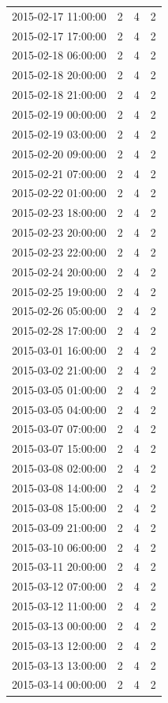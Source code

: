 \begin{tabular}{lrrr}
2015-02-17 11:00:00 & 2 & 4 & 2 \\
2015-02-17 17:00:00 & 2 & 4 & 2 \\
2015-02-18 06:00:00 & 2 & 4 & 2 \\
2015-02-18 20:00:00 & 2 & 4 & 2 \\
2015-02-18 21:00:00 & 2 & 4 & 2 \\
2015-02-19 00:00:00 & 2 & 4 & 2 \\
2015-02-19 03:00:00 & 2 & 4 & 2 \\
2015-02-20 09:00:00 & 2 & 4 & 2 \\
2015-02-21 07:00:00 & 2 & 4 & 2 \\
2015-02-22 01:00:00 & 2 & 4 & 2 \\
2015-02-23 18:00:00 & 2 & 4 & 2 \\
2015-02-23 20:00:00 & 2 & 4 & 2 \\
2015-02-23 22:00:00 & 2 & 4 & 2 \\
2015-02-24 20:00:00 & 2 & 4 & 2 \\
2015-02-25 19:00:00 & 2 & 4 & 2 \\
2015-02-26 05:00:00 & 2 & 4 & 2 \\
2015-02-28 17:00:00 & 2 & 4 & 2 \\
2015-03-01 16:00:00 & 2 & 4 & 2 \\
2015-03-02 21:00:00 & 2 & 4 & 2 \\
2015-03-05 01:00:00 & 2 & 4 & 2 \\
2015-03-05 04:00:00 & 2 & 4 & 2 \\
2015-03-07 07:00:00 & 2 & 4 & 2 \\
2015-03-07 15:00:00 & 2 & 4 & 2 \\
2015-03-08 02:00:00 & 2 & 4 & 2 \\
2015-03-08 14:00:00 & 2 & 4 & 2 \\
2015-03-08 15:00:00 & 2 & 4 & 2 \\
2015-03-09 21:00:00 & 2 & 4 & 2 \\
2015-03-10 06:00:00 & 2 & 4 & 2 \\
2015-03-11 20:00:00 & 2 & 4 & 2 \\
2015-03-12 07:00:00 & 2 & 4 & 2 \\
2015-03-12 11:00:00 & 2 & 4 & 2 \\
2015-03-13 00:00:00 & 2 & 4 & 2 \\
2015-03-13 12:00:00 & 2 & 4 & 2 \\
2015-03-13 13:00:00 & 2 & 4 & 2 \\
2015-03-14 00:00:00 & 2 & 4 & 2 \\

\end{tabular}
